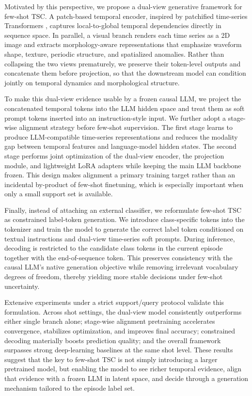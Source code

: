 \documentclass[lettersize,journal]{IEEEtran}
\begin{document}
Motivated by this perspective, we propose a dual-view generative framework for few-shot TSC. A patch-based temporal encoder, inspired by patchified time-series Transformers \cite{nietime}, captures local-to-global temporal dependencies directly in sequence space. In parallel, a visual branch renders each time series as a 2D image and extracts morphology-aware representations that emphasize waveform shape, texture, periodic structure, and spatialized anomalies. Rather than collapsing the two views prematurely, we preserve their token-level outputs and concatenate them before projection, so that the downstream model can condition jointly on temporal dynamics and morphological structure.

To make this dual-view evidence usable by a frozen causal LLM, we project the concatenated temporal tokens into the LLM hidden space and treat them as soft prompt tokens inserted into an instruction-style input. We further adopt a stage-wise alignment strategy before few-shot supervision. The first stage learns to produce LLM-compatible time-series representations and reduces the modality gap between temporal features and language-model hidden states. The second stage performs joint optimization of the dual-view encoder, the projection module, and lightweight LoRA adapters while keeping the main LLM backbone frozen. This design makes alignment a primary training target rather than an incidental by-product of few-shot finetuning, which is especially important when only a small support set is available. 

Finally, instead of attaching an external classifier, we reformulate few-shot TSC as constrained label-token generation. We introduce class-specific tokens into the tokenizer and train the model to generate the correct label token conditioned on textual instructions and dual-view time-series soft prompts. During inference, decoding is restricted to the candidate class tokens in the current episode together with the end-of-sequence token. This preserves consistency with the causal LLM’s native generation objective while removing irrelevant vocabulary degrees of freedom, thereby yielding more stable decisions under few-shot uncertainty.

Extensive experiments under a strict support/query protocol validate this formulation. Across shot settings, the dual-view model consistently outperforms either single branch alone; stage-wise alignment pretraining accelerates convergence, stabilizes optimization, and improves final accuracy; constrained decoding materially boosts prediction quality; and the overall framework surpasses strong deep-learning baselines at the same shot level. These results suggest that the key to few-shot TSC is not simply introducing a larger pretrained model, but enabling the model to see richer temporal evidence, align that evidence with a frozen LLM in latent space, and decide through a generation mechanism tailored to the episode label set.
\end{document}

